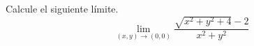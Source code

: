 Calcule el siguiente límite. 
\[
\lim_{(x,y)\to(0,0)} \frac{\sqrt{x^2 + y^2 + 4} - 2}{x^2 + y^2}
\]
